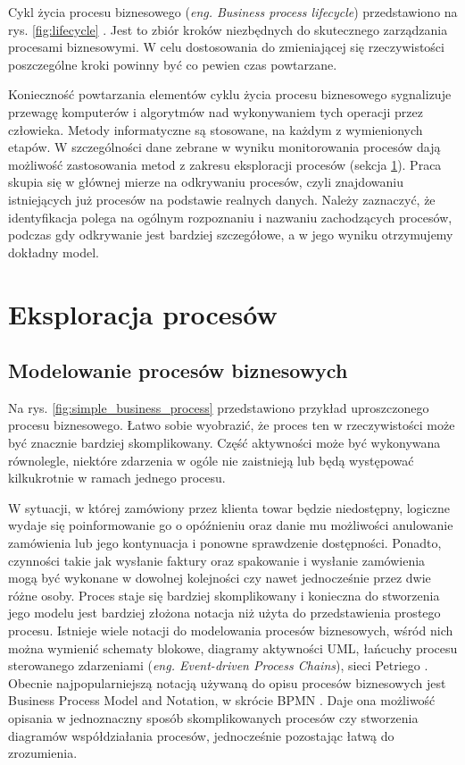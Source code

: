 Cykl życia procesu biznesowego (\textit{eng. Business process lifecycle}) przedstawiono na rys. \ref{fig:lifecycle} \cite{dumas2013fundamentals}. Jest to zbiór kroków niezbędnych do skutecznego zarządzania procesami biznesowymi. W celu dostosowania do zmieniającej się rzeczywistości poszczególne kroki powinny być co pewien czas powtarzane. 

Konieczność powtarzania elementów cyklu życia procesu biznesowego sygnalizuje przewagę komputerów i algorytmów nad wykonywaniem tych operacji przez człowieka. Metody informatyczne są stosowane, na każdym z wymienionych etapów. W szczególności dane zebrane w wyniku monitorowania procesów dają możliwość zastosowania metod z zakresu eksploracji procesów (sekcja \ref{sec:eksploracja}). Praca skupia się w głównej mierze na odkrywaniu procesów, czyli znajdowaniu istniejących już procesów na podstawie realnych danych. Należy zaznaczyć, że identyfikacja polega na ogólnym rozpoznaniu i nazwaniu zachodzących procesów, podczas gdy odkrywanie jest bardziej szczegółowe, a w jego wyniku otrzymujemy dokładny model.  


\section{Eksploracja procesów}
\label{sec:eksploracja}
\subsection{Modelowanie procesów biznesowych}
\label{sec:modelling}
Na rys. \ref{fig:simple_business_process} przedstawiono przykład uproszczonego procesu biznesowego. Łatwo sobie wyobrazić, że proces ten w rzeczywistości może być znacznie bardziej skomplikowany. Część aktywności może być wykonywana równolegle, niektóre zdarzenia w ogóle nie zaistnieją lub będą występować kilkukrotnie w ramach jednego procesu. 

W sytuacji, w której zamówiony przez klienta towar będzie niedostępny, logiczne wydaje się poinformowanie go o opóźnieniu oraz danie mu możliwości anulowanie zamówienia lub jego kontynuacja i ponowne sprawdzenie dostępności. Ponadto, czynności takie jak wysłanie faktury oraz spakowanie i wysłanie zamówienia mogą być wykonane w dowolnej kolejności czy nawet jednocześnie przez dwie różne osoby. Proces staje się bardziej skomplikowany i konieczna do stworzenia jego modelu jest bardziej złożona notacja niż użyta do przedstawienia prostego procesu. 
Istnieje wiele notacji do modelowania procesów biznesowych, wśród nich można wymienić schematy blokowe, diagramy aktywności UML, łańcuchy procesu sterowanego zdarzeniami (\textit{eng. Event-driven Process Chains}), sieci Petriego \cite{BPMComparission}. Obecnie najpopularniejszą notacją używaną do opisu procesów biznesowych jest Business Process  Model and Notation, w skrócie BPMN \cite{omg2011bpmn}. Daje ona możliwość opisania w jednoznaczny sposób skomplikowanych procesów czy stworzenia diagramów współdziałania procesów, jednocześnie pozostając łatwą do zrozumienia.

